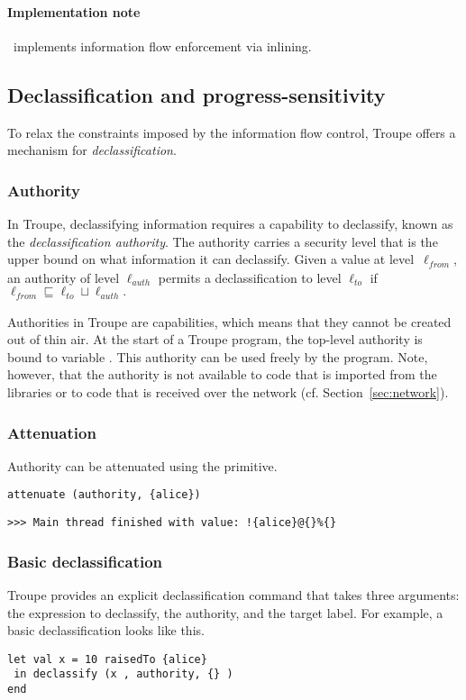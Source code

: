 \paragraph{Implementation note}
\troupelang\ implements information flow enforcement via inlining.



\subsection{Declassification and progress-sensitivity}
\label{sec:declassification}
To relax the constraints imposed by the information flow control, Troupe offers 
a mechanism for \emph{declassification}. 
\subsubsection{Authority}

In Troupe, declassifying information requires a capability to declassify,
known as the \emph{declassification authority}. 
The authority carries a security level that is the upper bound 
on what information it can declassify. 
%
Given  a value at 
level~$\ell_{\mathit{from}}$, an authority of 
level $\ell_{\mathit{auth}}$ permits a declassification to level 
$\ell_{\mathit{to}}$ if
${\ell_{\mathit{from}}} \sqsubseteq {  \ell_{\mathit{to}} \sqcup \ell_{\mathit{auth}}}.$

Authorities in Troupe are capabilities, which means that they cannot be 
created out of thin air. At the start of a Troupe program, the top-level authority is 
 bound to variable . This authority can be used freely by the program.
Note, however, that the authority is not available to code that is imported 
from the libraries or to code that is received over the network (cf. Section~\ref{sec:network}).


\subsubsection{Attenuation}
Authority can be attenuated using the  primitive. 

\begin{lstlisting}
attenuate (authority, {alice})    
\end{lstlisting}
\begin{verbatim}
>>> Main thread finished with value: !{alice}@{}%{}    
\end{verbatim}

\subsubsection{Basic declassification}
Troupe provides an explicit declassification command  that takes three arguments: 
the expression to declassify, the authority, and the target label. For example, a basic declassification
looks like this. 
\begin{lstlisting}
let val x = 10 raisedTo {alice}
 in declassify (x , authority, {} )
end 
\end{lstlisting}

